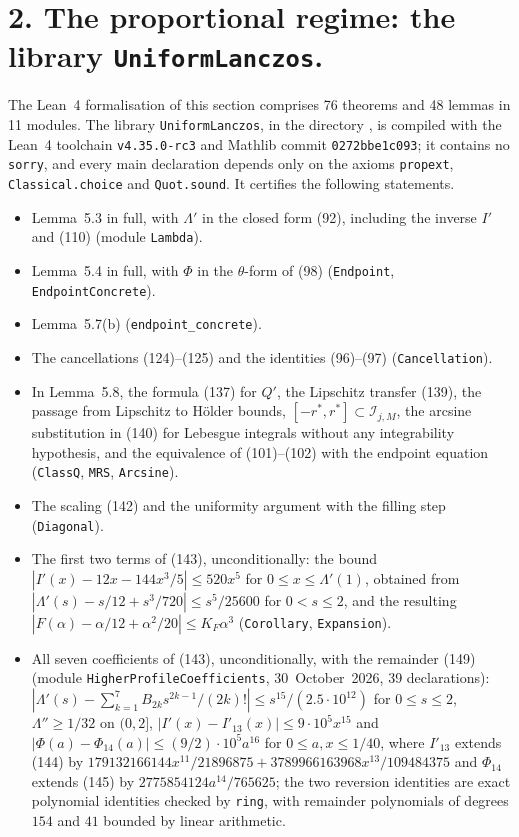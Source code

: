 \documentclass[11pt,a4paper]{article}
\newcommand{\R}{https://github.com/ralfanop/Certifications_Eulerian_polar-curve_computations}
\newcommand{\dir}[1]{\href{\R/tree/main/#1}{\texttt{\detokenize{#1}}}}
\newcommand{\eq}[1]{(#1)}
\begin{document}
\section*{2. The proportional regime: the library \texttt{UniformLanczos}.}
The Lean~4 formalisation of this section comprises 76 theorems and 48 lemmas in 11 modules. The library \texttt{UniformLanczos}, in the directory \dir{lean/UniformLanczos}, is compiled with the Lean~4 toolchain \texttt{v4.35.0-rc3} and Mathlib commit \texttt{0272bbe1c093}; it contains no \texttt{sorry}, and every main declaration depends only on the axioms \texttt{propext}, \texttt{Classical.choice} and \texttt{Quot.sound}. It certifies the following statements.
\begin{itemize}\setlength{\itemsep}{1pt}\raggedright
\item Lemma~5.3 in full, with $\Lambda'$ in the closed form \eq{92}, including the inverse $I'$ and \eq{110} (module \texttt{Lambda}).
\item Lemma~5.4 in full, with $\Phi$ in the $\theta$-form of \eq{98} (\texttt{Endpoint}, \texttt{EndpointConcrete}).
\item Lemma~5.7(b) (\texttt{endpoint\_concrete}).
\item The cancellations \eq{124}--\eq{125} and the identities \eq{96}--\eq{97} (\texttt{Cancellation}).
\item In Lemma~5.8, the formula \eq{137} for $Q'$, the Lipschitz transfer \eq{139}, the passage from Lipschitz to H\"older bounds, $[-r^*,r^*]\subset\mathcal I_{j,M}$, the arcsine substitution in \eq{140} for Lebesgue integrals without any integrability hypothesis, and the equivalence of \eq{101}--\eq{102} with the endpoint equation (\texttt{ClassQ}, \texttt{MRS}, \texttt{Arcsine}).
\item The scaling \eq{142} and the uniformity argument with the filling step (\texttt{Diagonal}).
\item The first two terms of \eq{143}, unconditionally: the bound $|I'(x)-12x-144x^3/5|\leq520x^5$ for $0\leq x\leq\Lambda'(1)$, obtained from $|\Lambda'(s)-s/12+s^3/720|\leq s^5/25600$ for $0<s\leq2$, and the resulting $|F(\alpha)-\alpha/12+\alpha^2/20|\leq K_F\alpha^3$ (\texttt{Corollary}, \texttt{Expansion}).
\item All seven coefficients of \eq{143}, unconditionally, with the remainder \eq{149} (module \texttt{HigherProfileCoefficients}, 30~October~2026, 39 declarations): $|\Lambda'(s)-\sum_{k=1}^{7}B_{2k}s^{2k-1}/(2k)!|\leq s^{15}/(2.5\cdot10^{12})$ for $0\leq s\leq2$, $\Lambda''\geq1/32$ on $(0,2]$, $|I'(x)-I'_{13}(x)|\leq9\cdot10^{5}x^{15}$ and $|\Phi(a)-\Phi_{14}(a)|\leq(9/2)\cdot10^{5}a^{16}$ for $0\leq a,x\leq1/40$, where $I'_{13}$ extends \eq{144} by $179132166144x^{11}/21896875+3789966163968x^{13}/109484375$ and $\Phi_{14}$ extends \eq{145} by $2775854124a^{14}/765625$; the two reversion identities are exact polynomial identities checked by \texttt{ring}, with remainder polynomials of degrees $154$ and $41$ bounded by linear arithmetic.
\end{itemize}
\end{document}
